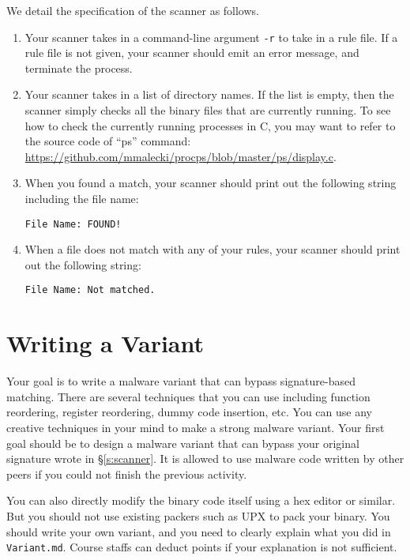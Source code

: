 \documentclass[a4paper, 11pt]{article}
\theoremstyle{definition}
\begin{document}
{We detail the specification of the scanner as follows.
%
\begin{enumerate}

  \item Your scanner takes in a command-line argument \texttt{-r} to
    take in a rule file. If a rule file is not given, your scanner
    should emit an error message, and terminate the process.

  \item Your scanner takes in a list of directory names. If the list
    is empty, then the scanner simply checks all the binary files that
    are currently running. To see how to check the currently running
    processes in C, you may want to refer to the source code of ``ps''
    command:
    \url{https://github.com/mmalecki/procps/blob/master/ps/display.c}.

  \item When you found a match, your scanner should print out the
    following string including the file name:
    \begin{verbatim}File Name: FOUND!\end{verbatim}

  \item When a file does not match with any of your rules, your
    scanner should print out the following string:
    \begin{verbatim}File Name: Not matched.\end{verbatim}

\end{enumerate}

\section{Writing a Variant}

Your goal is to write a malware variant that can bypass
signature-based matching. There are several techniques that you can
use including function reordering, register reordering, dummy code
insertion, etc. You can use any creative techniques in your mind to
make a strong malware variant. Your first goal should be to design a
malware variant that can bypass your original signature wrote in
\S\ref{s:scanner}. It is allowed to use malware code written by other
peers if you could not finish the previous activity.

You can also directly modify the binary code itself using a hex editor
or similar. But you should not use existing packers such as UPX to
pack your binary. You should write your own variant, and you need to
clearly explain what you did in \texttt{Variant.md}. Course staffs can
deduct points if your explanation is not sufficient.

}
\end{document}
